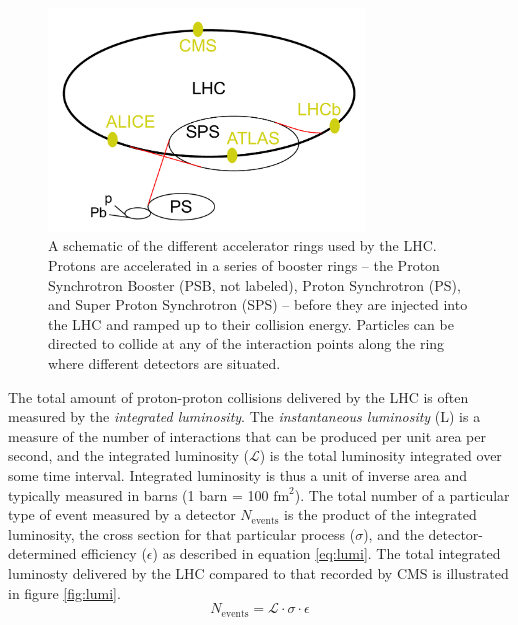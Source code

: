 \begin{figure}
	\centering
	\includegraphics[width=0.75\textwidth]{detector/figs/LHC}
	\renewcommand{\baselinestretch}{1.0}
	\caption[A schematic of the different accelerator rings used by the LHC.]{A schematic of the different accelerator rings used by the LHC. Protons are accelerated in a series of booster rings -- the Proton Synchrotron Booster (PSB, not labeled), Proton Synchrotron (PS), and Super Proton Synchrotron (SPS) -- before they are injected into the LHC and ramped up to their collision energy. Particles can be directed to collide at any of the interaction points along the ring where different detectors are situated. \cite{cc}}
	\label{fig:lhcSchematic}
\end{figure}

The total amount of proton-proton collisions delivered by the LHC is often measured by the {\it integrated luminosity}. The {\it instantaneous luminosity} (L) is a measure of the number of interactions that can be produced per unit area per second, and the integrated luminosity ($\mathcal{L}$) is the total luminosity integrated over some time interval. Integrated luminosity is thus a unit of inverse area and typically measured in barns (1 barn = 100 $\text{fm}^2$). The total number of a particular type of event measured by a detector $N_{\mathrm{events}}$ is the product of the integrated luminosity, the cross section for that particular process ($\sigma$), and the detector-determined efficiency ($\epsilon$) as described in equation \ref{eq:lumi}. The total integrated luminosty delivered by the LHC compared to that recorded by CMS is illustrated in figure \ref{fig:lumi}.
\begin{equation}
	N_{\mathrm{events}} = \mathcal{L} \cdot \sigma \cdot \epsilon
	\label{eq:lumi}
\end{equation}

